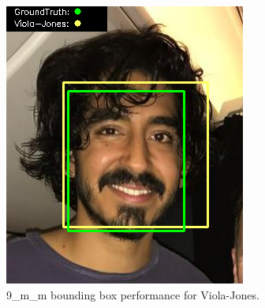 \documentclass{l4proj}
\begin{document}
\begin{appendices}
\begin{figure}[h!]
\begin{minipage}{0.49\textwidth}
     \includegraphics[width=\textwidth]{images/appendix/viola/9.png}
    \caption{9\_m\_m bounding box performance for Viola-Jones.}
    \label{whoopi_result}
  \end{minipage}
\end{figure}


\end{appendices}
\end{document}
